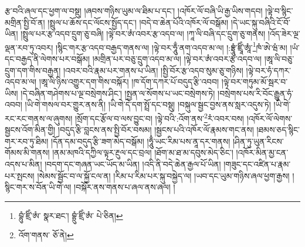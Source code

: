 རྩ་བའི་ཞལ་དང་ཕྱག་ལ་བསྡུ། །ཞབས་གཉིས་ཡུམ་ལ་ཐིམ་པ་དང་། །འཁོར་ལོ་བཞི་ཡི་རྒྱ་ཡིས་གདབ། །ལྟེ་བ་སྙིང་མགྲིན་སྤྱི་བོ་ན། །སྤྲུལ་པ་ཆོས་དང་ལོངས་སྤྱོད་དང་། །བདེ་བ་ཆེན་པོའི་འཁོར་ལོ་བསྒོམ། །དེ་ཡང་སྐུ་བཞིའི་ངོ་བོ་ཡིན། །སྤྲུལ་པར་རྩ་འདབ་དྲུག་ཅུ་བཞི། །ལྟེ་བར་ཨཾ་འབར་རྩ་འདབ་ལ། །ཀཱ་ལི་བཞི་དང་དྲུག་ཅུ་གནས། །འོད་ཟེར་ལྔ་ལྡན་རབ་ཏུ་འབར། །སྙིང་གར་རྩ་འདབ་བརྒྱད་གནས་ལ། །ལྟེ་བར་ཧཱུྃ་ནག་འདབ་མ་ལ། །:བྷྲཱུཾ་ཛྲཱིཾ་ཨཱཾ་\footnote{བྷུཾ་ཛྲིཾ་ཨཾ་  སྣར་ཐང་། བྷྲུཾ་ཛྲིཾ་ཨཾ་  པེ་ཅིན། }ཁཾ་ཨེ་ཝཾ་མ། །ཡཾ་དང་བརྒྱད་ནི་ལེགས་པར་བསྒོམ། །མགྲིན་པར་བཅུ་དྲུག་འདབ་མ་ལ། །ལྟེ་བར་ཨཾ་འབར་རྩ་འདབ་ལ། །ཨཱ་ལི་བཅུ་དྲུག་དག་གིས་བརྒྱན། །འབར་བའི་རྣམ་པར་གནས་པ་ཡིན། །སྤྱི་བོར་རྩ་འདབ་སུམ་ཅུ་གཉིས། །ལྟེ་བར་ཧཾ་དཀར་འདབ་མ་ལ། །ཨཱ་ལི་ཉིས་འགྱུར་དག་གིས་བསྐོར། །ཁ་དོག་དཀར་པོ་བདུད་རྩི་འབབ། །ལྟེ་བར་གཏུམ་མོ་སྦར་བ་ཡིས། །དེ་བཞིན་གཤེགས་པ་ལྔ་བསྲེགས་ཤིང་། །སྤྱན་ལ་སོགས་པ་ཡང་བསྲེགས་ཏེ། །བསྲེགས་པས་རི་བོང་རྒྱུན་ཧཾ་འབབ། །ཡི་གེ་གསལ་བར་གྱུར་ནས་ནི། །ཡི་གེ་དེ་དག་སྤྲོ་དང་བསྡུ། །བསྐུལ་སྦྱང་བྱས་ནས་སླར་འདུས་ཏེ། །ཡི་གེ་རང་རང་གནས་ལ་ཞུགས། །སྲོག་དང་རྩོལ་བ་ལས་བྱུང་བ། །ལྟེ་བའི་:འོག་ནས་\footnote{འོག་གནས་  ཅོ་ནེ། }རཾ་འབར་བས། །འཁོར་ལོ་ལེགས་སྦྱངས་འོག་མིན་གྱི། །བདུད་རྩི་བླངས་ནས་སྤྱི་བོར་བསམ། །སྦྱངས་པའི་འཁོར་ལོ་རྣམས་གང་ནས། །ཐམས་ཅད་སྙིང་གར་རབ་ཏུ་ཐིམ། །དོན་དམ་བདུད་རྩི་ཟག་མེད་བསྒོམ། །ཧཱུྃ་ཡང་རིམ་པས་ནཱ་དར་གནས། །ཤིན་ཏུ་ཡུན་རིངས་གོམས་མི་གནས། །ནམ་མཁའི་དཀྱིལ་ལྟར་རྔུལ་དང་བྲལ། །ཐོག་མ་ཐ་མ་དབུས་མེད་ཅིང་། །འཁོར་མིན་མྱ་ངན་འདས་པ་མིན། །བདག་དང་གཞན་ཡང་ཡོད་མ་ཡིན། །འདི་ནི་བདེ་ཆེན་རྒྱལ་པོ་ཡིན། །གཟུང་དང་འཛིན་པ་རྣམ་པར་སྤངས། །སེམས་སྦྱོང་བ་ལ་སྐྱོ་ངལ་ན། །རིམ་པ་རིམ་པར་སྐུ་བསྐྱེད་ལ། །ཡབ་དང་ཡུམ་གཉིས་ཞལ་ཕྱག་རྒྱས། །སྙིང་གར་ས་བོན་ཡི་གེ་ལ། །བསྐོར་ནས་གནས་པ་ཞལ་ནས་ཞལ། །
